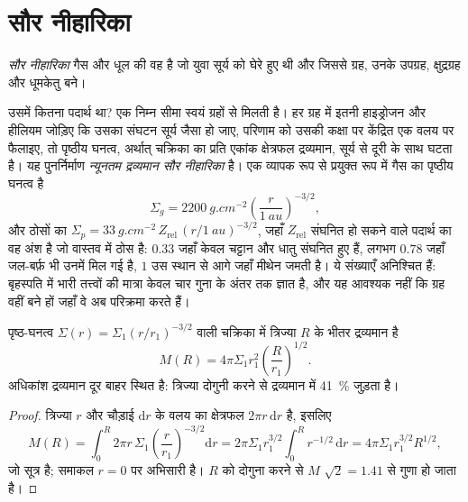 \section{सौर नीहारिका}

\begin{definition}[सौर नीहारिका]\label{def:b2:planet-formation-meteorites:nebula}
\emph{सौर नीहारिका} गैस और धूल की वह  है
जो युवा सूर्य को घेरे हुए थी और जिससे ग्रह, उनके
उपग्रह, क्षुद्रग्रह और धूमकेतु बने।
\end{definition}

उसमें कितना पदार्थ था? एक निम्न सीमा स्वयं ग्रहों से मिलती है।
हर ग्रह में इतनी हाइड्रोजन और हीलियम जोड़िए कि उसका संघटन
सूर्य जैसा हो जाए, परिणाम को उसकी कक्षा पर केंद्रित एक वलय पर फैलाइए, तो पृष्ठीय
घनत्व, अर्थात् चक्रिका का प्रति एकांक क्षेत्रफल द्रव्यमान, सूर्य से दूरी के साथ घटता
है। यह पुनर्निर्माण \emph{न्यूनतम द्रव्यमान सौर
नीहारिका} है। एक व्यापक रूप से प्रयुक्त रूप में गैस का पृष्ठीय
घनत्व है
\[
  \Sigma_g = \qty{2200}{g.cm^{-2}}\left(\frac{r}{\qty{1}{au}}\right)^{-3/2},
\]
और ठोसों का $\Sigma_p = \qty{33}{g.cm^{-2}}\,Z_{\mathrm{rel}}\,
(r/\qty{1}{au})^{-3/2}$, जहाँ $Z_{\mathrm{rel}}$ संघनित हो सकने वाले पदार्थ का
वह अंश है जो वास्तव में ठोस है: $0.33$ जहाँ केवल चट्टान और धातु
संघनित हुए हैं, लगभग $0.78$ जहाँ जल-बर्फ़ भी उनमें मिल गई है, $1$ उस स्थान से आगे
जहाँ मीथेन जमती है। ये संख्याएँ अनिश्चित हैं: बृहस्पति में भारी तत्त्वों की मात्रा
केवल चार गुना के अंतर तक ज्ञात है, और यह आवश्यक नहीं कि ग्रह वहीं
बने हों जहाँ वे अब परिक्रमा करते हैं।

\begin{proposition}[चक्रिका का द्रव्यमान]\label{prop:b2:planet-formation-meteorites:disc-mass}
पृष्ठ-घनत्व $\Sigma(r) = \Sigma_1 (r/r_1)^{-3/2}$ वाली चक्रिका में
त्रिज्या $R$ के भीतर द्रव्यमान है
\[
  M(R) = 4\pi\Sigma_1 r_1^2 \left(\frac{R}{r_1}\right)^{1/2}.
\]
अधिकांश द्रव्यमान दूर बाहर स्थित है: त्रिज्या दोगुनी करने से द्रव्यमान में \qty{41}{\percent}
जुड़ता है।
\end{proposition}

\begin{proof}
त्रिज्या $r$ और चौड़ाई $\mathrm dr$ के वलय का क्षेत्रफल $2\pi r\,\mathrm dr$ है, इसलिए
\[
  M(R) = \int_0^R 2\pi r\,\Sigma_1 \left(\frac{r}{r_1}\right)^{-3/2}\mathrm dr
       = 2\pi\Sigma_1 r_1^{3/2}\int_0^R r^{-1/2}\,\mathrm dr
       = 4\pi\Sigma_1 r_1^{3/2} R^{1/2},
\]
जो सूत्र है; समाकल $r = 0$ पर अभिसारी है। $R$ को दोगुना करने से
$M$ $\sqrt 2 = 1.41$ से गुणा हो जाता है।
\end{proof}

